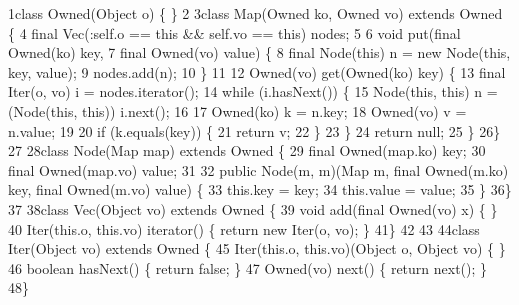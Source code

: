 \begin{tightcode}
\quad\num{1}class Owned(Object o) \{ \}
\quad\num{2}
\quad\num{3}class Map(Owned ko, Owned vo) extends Owned \{
\quad\num{4}  final Vec(:self.o == this && self.vo == this) nodes;
\quad\num{5}
\quad\num{6}  void put(final Owned(ko) key,
\quad\num{7}           final Owned(vo) value) \{
\quad\num{8}    final Node(this) n = new Node(this, key, value);
\quad\num{9}    nodes.add(n);
\quad\num{10}  \}
\quad\num{11}
\quad\num{12}  Owned(vo) get(Owned(ko) key) \{
\quad\num{13}    final Iter(o, vo) i = nodes.iterator();
\quad\num{14}    while (i.hasNext()) \{
\quad\num{15}      Node(this, this) n = (Node(this, this)) i.next();
\quad\num{16}      
\quad\num{17}      Owned(ko) k = n.key;
\quad\num{18}      Owned(vo) v = n.value;
\quad\num{19}
\quad\num{20}      if (k.equals(key)) \{
\quad\num{21}          return v;
\quad\num{22}      \}
\quad\num{23}    \}
\quad\num{24}    return null;
\quad\num{25}  \}
\quad\num{26}\}
\quad\num{27}
\quad\num{28}class Node(Map map) extends Owned \{
\quad\num{29}  final Owned(map.ko) key;
\quad\num{30}  final Owned(map.vo) value;
\quad\num{31}
\quad\num{32}  public Node(m, m)(Map m, final Owned(m.ko) key, final Owned(m.vo) value) \{
\quad\num{33}    this.key = key;
\quad\num{34}    this.value = value;
\quad\num{35}  \}
\quad\num{36}\}
\quad\num{37}
\quad\num{38}class Vec(Object vo) extends Owned \{
\quad\num{39}  void add(final Owned(vo) x) \{ \}
\quad\num{40}  Iter(this.o, this.vo) iterator() \{ return new Iter(o, vo); \}
\quad\num{41}\}
\quad\num{42}
\quad\num{43}
\quad\num{44}class Iter(Object vo) extends Owned \{
\quad\num{45}  Iter(this.o, this.vo)(Object o, Object vo) \{ \}
\quad\num{46}  boolean hasNext() \{ return false; \}
\quad\num{47}  Owned(vo) next() \{ return next(); \}
\quad\num{48}\}
\end{tightcode}

